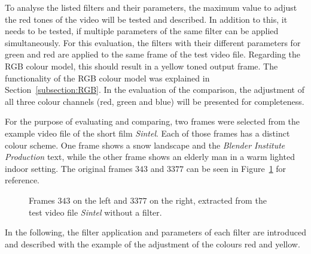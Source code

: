 \documentclass[../MasterThesis.tex]{subfiles}
\begin{document}
To analyse the listed filters and their parameters, the maximum value to adjust the red tones of the video will be tested and described. 
%
In addition to this, it needs to be tested, if multiple parameters of the same filter can be applied simultaneously. For this evaluation, the filters with their different parameters for green and red are applied to the same frame of the test video file. Regarding the RGB colour model, this should result in a yellow toned output frame. The functionality of the RGB colour model was explained in Section~\ref{subsection:RGB}. 
%
In the evaluation of the comparison, the adjustment of all three colour channels (red, green and blue) will be presented for completeness.

For the purpose of evaluating and comparing, two frames were selected from the example video file of the short film \textit{Sintel}. Each of those frames has a distinct colour scheme. One frame shows a snow landscape and the \textit{Blender Institute Production} text, while the other frame shows an elderly man in a warm lighted indoor setting. The original frames $343$ and $3377$ can be seen in Figure~\ref{figure:nofilter} for reference.


\begin{figure}[H]
	\begin{center}
		\caption[Frames $343$ and $3377$ from the test video file without a filter.]{Frames $343$ on the left and $3377$ on the right, extracted from the test video file \textit{Sintel} without a filter.}
		\label{figure:nofilter}
	\end{center}
\end{figure}





In the following, the filter application and parameters of each filter are introduced and described with the example of the adjustment of the colours red and yellow.
\end{document}
